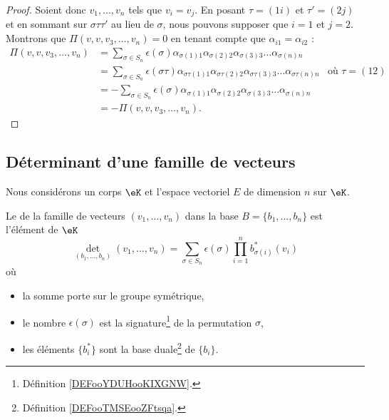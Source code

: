 \begin{proof}
	Soient donc \( v_1,\ldots, v_n\) tels que \( v_i=v_j\). En posant \( \tau=(1i)\) et \( \tau'=(2j)\) et en sommant sur \( \sigma\tau\tau'\) au lieu de \( \sigma\), nous pouvons supposer que \( i=1\) et \( j=2\). Montrons que \( \Pi(v,v,v_3,\ldots, v_n)=0\) en tenant compte que \( \alpha_{i1}=\alpha_{i2}\) :
	\begin{subequations}
		\begin{align}
			\Pi(v,v,v_3,\ldots, v_n) & =\sum_{\sigma\in S_n}\epsilon(\sigma)\alpha_{\sigma(1)1}\alpha_{\sigma(2)2}\alpha_{\sigma(3)3}\ldots \alpha_{\sigma(n)n}                                            \\
			                         & =\sum_{\sigma\in S_n}\epsilon(\sigma\tau)\alpha_{\sigma\tau(1)1}\alpha_{\sigma\tau(2)2}\alpha_{\sigma\tau(3)3}\ldots \alpha_{\sigma\tau(n)n} & \text{où } \tau=(12) \\
			                         & =-\sum_{\sigma\in S_n}\epsilon(\sigma)\alpha_{\sigma(1)1}\alpha_{\sigma(2)2}\alpha_{\sigma(3)3}\ldots \alpha_{\sigma(n)n}                                           \\
			                         & =-\Pi(v,v,v_3,\ldots, v_n).
		\end{align}
	\end{subequations}
\end{proof}

\subsection{Déterminant d'une famille de vecteurs}

Nous considérons un corps \( \eK\) et l'espace vectoriel \( E\) de dimension \( n\) sur \( \eK\).

\begin{definition}\label{DEFooODDFooSNahPb}
	Le  de la famille de vecteurs \( (v_1,\ldots, v_n)\) dans la base \( B=\{ b_1,\ldots, b_n \}\) est l'élément de \( \eK\)
	\begin{equation}        \label{EQooOJEXooXUpwfZ}
		\det_{(b_1,\ldots, b_n)}(v_1,\ldots, v_n)=\sum_{\sigma\in S_n}\epsilon(\sigma)\prod_{i=1}^nb^*_{\sigma(i)}(v_i)
	\end{equation}
	où
	\begin{itemize}
		\item
		      la somme porte sur le groupe symétrique,
		\item
		      le nombre \( \epsilon(\sigma)\) est la signature\footnote{Définition \ref{DEFooYDUHooKIXGNW}.} de la permutation \( \sigma\),
		\item
		      les éléments \( \{ b^*_i \}\) sont la base duale\footnote{Définition \ref{DEFooTMSEooZFtsqa}.} de \( \{ b_i \}\).
	\end{itemize}
\end{definition}

